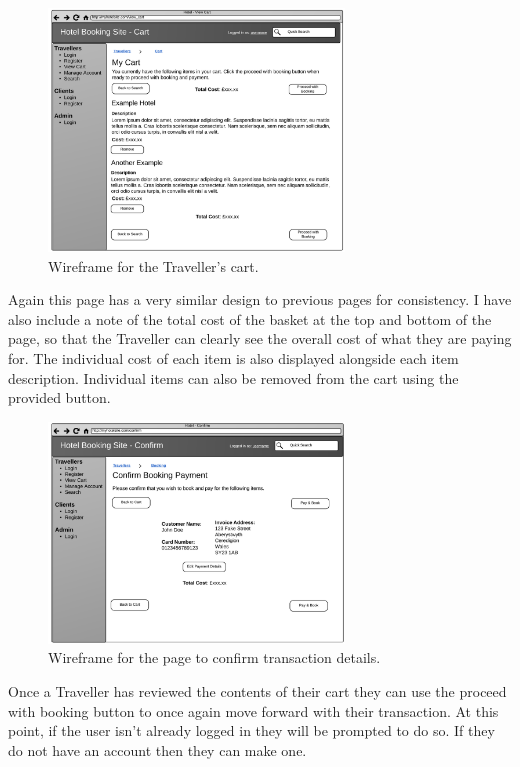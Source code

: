 \documentclass{article}
\begin{document}
\begin{figure}[H]
\centering
\includegraphics[width=0.7\textwidth]{img/wireframes/Cart.png}
\caption{Wireframe for the Traveller's cart.}
\label{fig:wireframe-traveller-cart}
\end{figure}

Again this page has a very similar design to previous pages for consistency. I have also include a note of the total cost of the basket at the top and bottom of the page, so that the Traveller can clearly see the overall cost of what they are paying for. The individual cost of each item is also displayed alongside each item description. Individual items can also be removed from the cart using the provided button.

\begin{figure}[H]
\centering
\includegraphics[width=0.7\textwidth]{img/wireframes/ConfirmBooking.png}
\caption{Wireframe for the page to confirm transaction details.}
\label{fig:wireframe-traveller-confirm}
\end{figure}

Once a Traveller has reviewed the contents of their cart they can use the proceed with booking button to once again move forward with their transaction. At this point, if the user isn't already logged in they will be prompted to do so. If they do not have an account then they can make one. 
\end{document}
